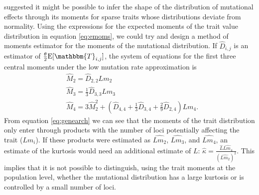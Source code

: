 \citet{Schraiber2015} suggested it might be possible to infer the shape of the
distribution of mutational effects through its moments for sparse traits whose
distributions deviate from normality. Using the expressions for the expected
moments of the trait value distribution in equation \eqref{eq:emoms}, we could
try and design a method of moments estimator for the moments of the mutational
distribution. If $\hat{D}_{i,j}$ is an estimator of $\T \E[\mathbbm{T}_{i,j}]$,
the system of equations for the first three central moments under the low
mutation rate approximation is
\begin{align}
\label{eq:genearch}
  &\widehat{M}_2 = \widehat{D}_{2,2}Lm_2 \nonumber \\
  &\widehat{M}_3 = \frac{1}{3}\widehat{D}_{3,3}Lm_3 \nonumber \\
  &\widehat{M}_4 = 3\widehat{M}_2^2 + (\widehat{D}_{4,4} + \frac{1}{3} \widehat{D}_{3,4} + \frac{2}{9} \widehat{D}_{2,4})Lm_4.
\end{align}
From equation \eqref{eq:genearch} we can see that the moments of the trait
distribution only enter through products with the number of loci potentially
affecting the trait ($Lm_i$). If these products were estimated as
$\widehat{Lm_2}$, $\widehat{Lm_3}$, and $\widehat{Lm_4}$, an estimate of the
kurtosis would need an additional estimate of $L$: $\hat{\kappa}
= \frac{\hat{L}\widehat{Lm_4}}{(\widehat{Lm_2})^2}$. This implies that it is not
possible to distinguish, using the trait moments at the population level,
whether the mutational distribution has a large kurtosis or is controlled by a
small number of loci.

